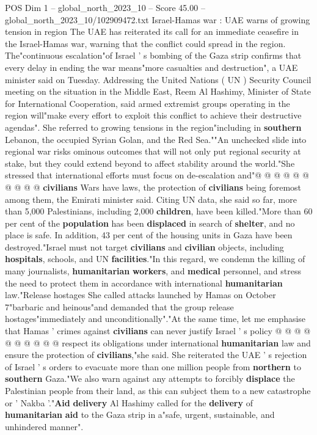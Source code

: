 \begin{textsample}{POS Dim 1 – global\_north\_2023\_10 – Score 45.00 – global\_north\_2023\_10/102909472.txt}  \label{ex:f1_pos_314}
Israel-Hamas war : UAE warns of growing tension in region The UAE has reiterated its call for an immediate ceasefire in the Israel-Hamas war, warning that the conflict could spread in the region.
The"continuous escalation"of Israel ' s bombing of the Gaza strip confirms that every delay in ending the war means"more casualties and destruction", a UAE minister said on Tuesday.
Addressing the United Nations ( UN ) Security Council meeting on the situation in the Middle East, Reem Al Hashimy, Minister of State for International Cooperation, said armed extremist groups operating in the region will"make every effort to exploit this conflict to achieve their destructive agendas".
She referred to growing tensions in the region"including in \textbf{southern} Lebanon, the occupied Syrian Golan, and the Red Sea.""An unchecked slide into regional war risks ominous outcomes that will not only put regional security at stake, but they could extend beyond to affect stability around the world."She stressed that international efforts must focus on de-escalation and"@ @ @ @ @ @ @ @ @ @ \textbf{civilians} Wars have laws, the protection of \textbf{civilians} being foremost among them, the Emirati minister said.
Citing UN data, she said so far, more than 5,000 Palestinians, including 2,000 \textbf{children}, have been killed."More than 60 per cent of the \textbf{population} has been \textbf{displaced} in search of \textbf{shelter}, and no place is safe.
In addition, 43 per cent of the housing units in Gaza have been destroyed."Israel must not target \textbf{civilians} and \textbf{civilian} objects, including \textbf{hospitals}, schools, and UN \textbf{facilities}."In this regard, we condemn the killing of many journalists, \textbf{humanitarian} \textbf{workers}, and \textbf{medical} personnel, and stress the need to protect them in accordance with international \textbf{humanitarian} law."Release hostages She called attacks launched by Hamas on October 7"barbaric and heinous"and demanded that the group release hostages"immediately and unconditionally"."At the same time, let me emphasise that Hamas ' crimes against \textbf{civilians} can never justify Israel ' s policy @ @ @ @ @ @ @ @ @ @ respect its obligations under international \textbf{humanitarian} law and ensure the protection of \textbf{civilians},"she said.
She reiterated the UAE ' s rejection of Israel ' s orders to evacuate more than one million people from \textbf{northern} to \textbf{southern} Gaza."We also warn against any attempts to forcibly \textbf{displace} the Palestinian people from their land, as this can subject them to a new catastrophe or ' Nakba '."\textbf{Aid} \textbf{delivery} Al Hashimy called for the \textbf{delivery} of \textbf{humanitarian} \textbf{aid} to the Gaza strip in a"safe, urgent, sustainable, and unhindered manner".

\end{textsample}
